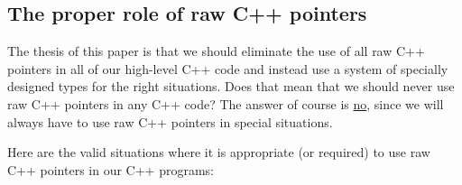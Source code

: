\documentclass[pdf,ps2pdf,11pt]{SANDreport}
\begin{document}
%
{}\subsection{The proper role of raw C++ pointers}
\label{sec:role-of-raw-pointers}
%

The thesis of this paper is that we should eliminate the use of all
raw C++ pointers in all of our high-level C++ code and instead use a
system of specially designed types for the right situations.  Does
that mean that we should never use raw C++ pointers in any C++ code?
The answer of course is {}\underline{no}, since we will always have to
use raw C++ pointers in special situations.

Here are the valid situations where it is appropriate (or required)
to use raw C++ pointers in our C++ programs:
\end{document}
